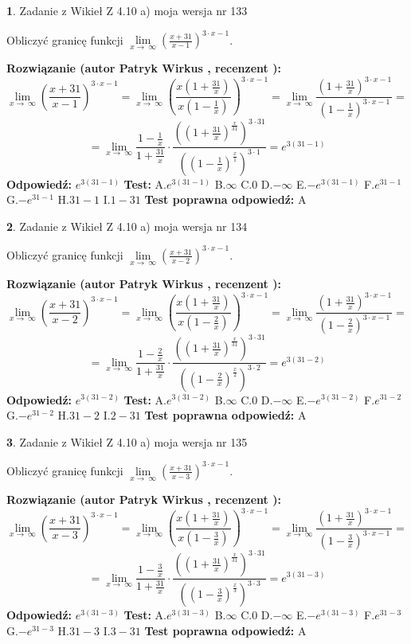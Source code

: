 \documentclass[12pt, a4paper]{article}
\theoremstyle{definition} %
\newtheorem{zad}{}
\newcommand{\zadStart}[1]{\begin{zad}#1\newline}
\newcommand{\zadStop}{\end{zad}}
\newcommand{\rozwStart}[2]{\noindent \textbf{Rozwiązanie (autor #1 , recenzent #2): }\newline}
\newcommand{\rozwStop}{\newline}
\newcommand{\odpStart}{\noindent \textbf{Odpowiedź:}\newline}
\newcommand{\odpStop}{\newline}
\newcommand{\testStart}{\noindent \textbf{Test:}\newline}
\newcommand{\testStop}{\newline}
\newcommand{\kluczStart}{\noindent \textbf{Test poprawna odpowiedź:}\newline}
\newcommand{\kluczStop}{\newline}
\begin{document}
\zadStart{Zadanie z Wikieł Z 4.10 a) moja wersja nr 133}


Obliczyć granicę funkcji  $\lim\limits_{x\to\ \infty}(\frac{x+31}{x-1})^{3\cdot x-1}$.
\zadStop
\rozwStart{Patryk Wirkus}{}
$$\lim\limits_{x\to\ \infty}(\frac{x+31}{x-1})^{3\cdot x-1} = \lim\limits_{x\to\ \infty}(\frac{x(1+\frac{31}{x})}{x(1-\frac{1}{x})})^{3\cdot x-1}=\lim\limits_{x\to\ \infty}\frac{(1+\frac{31}{x})^{3\cdot x-1}}{(1-\frac{1}{x})^{3\cdot x-1}}=$$
$$=\lim\limits_{x\to\ \infty}\frac{1-\frac{1}{x}}{1+\frac{31}{x}}\cdot\frac{((1+\frac{31}{x})^{\frac{x}{31}})^{3\cdot31}}{((1-\frac{1}{x})^{\frac{x}{1}})^{3\cdot1}}=e^{3(31-1)}$$
\rozwStop
\odpStart
$e^{3(31-1)}$
\odpStop
\testStart
A.$e^{3(31-1)}$ B.$\infty$ C.$0$ D.$-\infty$ E.$-e^{3(31-1)}$
F.$e^{31-1}$ G.$-e^{31-1}$
H.$31-1$
I.$1-31$
\testStop
\kluczStart
A
\kluczStop



\zadStart{Zadanie z Wikieł Z 4.10 a) moja wersja nr 134}


Obliczyć granicę funkcji  $\lim\limits_{x\to\ \infty}(\frac{x+31}{x-2})^{3\cdot x-1}$.
\zadStop
\rozwStart{Patryk Wirkus}{}
$$\lim\limits_{x\to\ \infty}(\frac{x+31}{x-2})^{3\cdot x-1} = \lim\limits_{x\to\ \infty}(\frac{x(1+\frac{31}{x})}{x(1-\frac{2}{x})})^{3\cdot x-1}=\lim\limits_{x\to\ \infty}\frac{(1+\frac{31}{x})^{3\cdot x-1}}{(1-\frac{2}{x})^{3\cdot x-1}}=$$
$$=\lim\limits_{x\to\ \infty}\frac{1-\frac{2}{x}}{1+\frac{31}{x}}\cdot\frac{((1+\frac{31}{x})^{\frac{x}{31}})^{3\cdot31}}{((1-\frac{2}{x})^{\frac{x}{2}})^{3\cdot2}}=e^{3(31-2)}$$
\rozwStop
\odpStart
$e^{3(31-2)}$
\odpStop
\testStart
A.$e^{3(31-2)}$ B.$\infty$ C.$0$ D.$-\infty$ E.$-e^{3(31-2)}$
F.$e^{31-2}$ G.$-e^{31-2}$
H.$31-2$
I.$2-31$
\testStop
\kluczStart
A
\kluczStop



\zadStart{Zadanie z Wikieł Z 4.10 a) moja wersja nr 135}


Obliczyć granicę funkcji  $\lim\limits_{x\to\ \infty}(\frac{x+31}{x-3})^{3\cdot x-1}$.
\zadStop
\rozwStart{Patryk Wirkus}{}
$$\lim\limits_{x\to\ \infty}(\frac{x+31}{x-3})^{3\cdot x-1} = \lim\limits_{x\to\ \infty}(\frac{x(1+\frac{31}{x})}{x(1-\frac{3}{x})})^{3\cdot x-1}=\lim\limits_{x\to\ \infty}\frac{(1+\frac{31}{x})^{3\cdot x-1}}{(1-\frac{3}{x})^{3\cdot x-1}}=$$
$$=\lim\limits_{x\to\ \infty}\frac{1-\frac{3}{x}}{1+\frac{31}{x}}\cdot\frac{((1+\frac{31}{x})^{\frac{x}{31}})^{3\cdot31}}{((1-\frac{3}{x})^{\frac{x}{3}})^{3\cdot3}}=e^{3(31-3)}$$
\rozwStop
\odpStart
$e^{3(31-3)}$
\odpStop
\testStart
A.$e^{3(31-3)}$ B.$\infty$ C.$0$ D.$-\infty$ E.$-e^{3(31-3)}$
F.$e^{31-3}$ G.$-e^{31-3}$
H.$31-3$
I.$3-31$
\testStop
\kluczStart
A
\kluczStop
\end{document}
